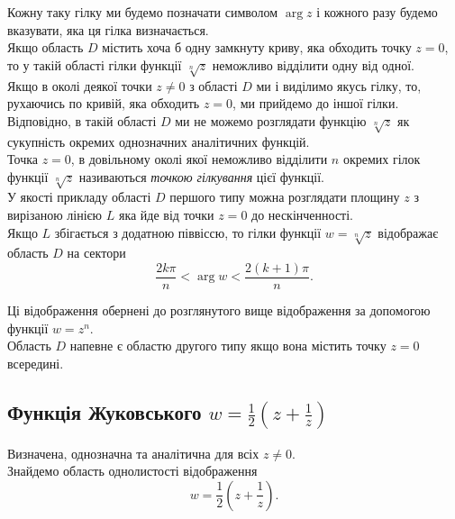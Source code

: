 Кожну таку гілку ми будемо позначати символом $\arg z$ і кожного разу будемо вказувати, яка ця гілка визначається. \\

Якщо область $D$ містить хоча б одну замкнуту криву, яка обходить точку $z = 0$, то у такій області гілки функції $\sqrt[n]{z}$ неможливо відділити одну від одної. \\

Якщо в околі деякої точки $z \ne 0$ з області $D$ ми і виділимо якусь гілку, то, рухаючись по кривій, яка обходить $z = 0$, ми прийдемо до іншої гілки. \\

Відповідно, в такій області $D$ ми не можемо розглядати функцію $\sqrt[n]{z}$ як сукупність окремих однозначних аналітичних функцій. \\

Точка $z = 0$, в довільному околі якої неможливо відділити $n$ окремих гілок функції $\sqrt[n]{z}$ називаються \textit{точкою гілкування} цієї функції. \\

У якості прикладу області $D$ першого типу можна розглядати площину $z$ з вирізаною лінією $L$ яка йде від точки $z = 0$ до нескінченності. \\

Якщо $L$ збігається з додатною піввіссю, то гілки функції $w = \sqrt[n]{z}$ відображає область $D$ на сектори
\begin{equation}
	\label{eq:3.1.14}
	\dfrac{2 k \pi}{n} < \arg w < \dfrac{2 (k + 1) \pi}{n}.
\end{equation}

Ці відображення обернені до розглянутого вище відображення за допомогою функції $w = z^n$. \\

Область $D$ напевне є областю другого типу якщо вона містить точку $z = 0$ всередині.

\subsection{Функція Жуковського $w = \frac{1}{2} \left( z + \frac{1}{z} \right)$}

Визначена, однозначна та аналітична для всіх $z \ne 0$. \\

Знайдемо область однолистості відображення
\begin{equation}
	\label{eq:3.2.1}
	w = \frac{1}{2} \left( z + \frac{1}{z} \right).
\end{equation}

